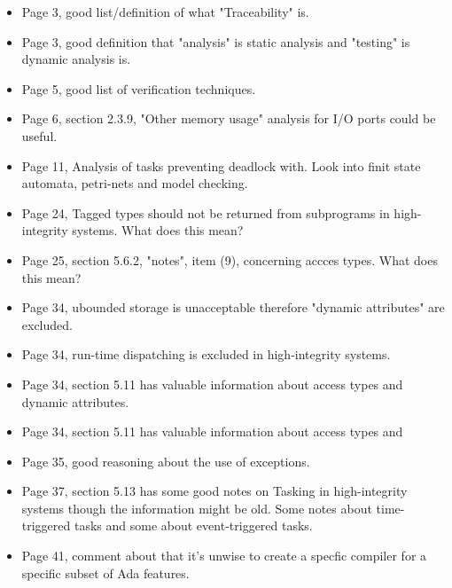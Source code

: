 \begin{itemize}
    \item Page 3, good list/definition of what "Traceability" is.
    \item Page 3, good definition that "analysis" is static analysis and
        "testing" is dynamic analysis is.
    \item Page 5, good list of verification techniques.
    \item Page 6, section 2.3.9, "Other memory usage" analysis for I/O ports
        could be useful.
    \item Page 11, Analysis of tasks preventing deadlock with. Look into finit
        state automata, petri-nets and model checking.
    \item Page 24, Tagged types should not be returned from subprograms in
        high-integrity systems. What does this mean?
    \item Page 25, section 5.6.2, "notes", item (9), concerning accces types.
        What does this mean?
    \item Page 34, ubounded storage is unacceptable therefore "dynamic
        attributes" are excluded.
    \item Page 34, run-time dispatching is excluded in high-integrity systems.
    \item Page 34, section 5.11 has valuable information about access types and
        dynamic attributes.
    \item Page 34, section 5.11 has valuable information about access types and
    \item Page 35, good reasoning about the use of exceptions.
    \item Page 37, section 5.13 has some good notes on Tasking in
        high-integrity systems though the information might be old. Some notes
        about time-triggered tasks and some about event-triggered tasks.
    \item Page 41, comment about that it's unwise to create a specfic compiler
        for a specific subset of Ada features.
\end{itemize}

